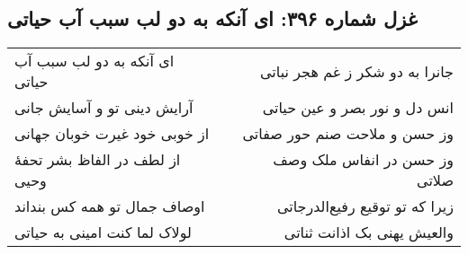 \begin{center}
\section*{غزل شماره ۳۹۶: ای آنکه به دو لب سبب آب حیاتی}
\label{sec:396}
\begin{longtable}{l p{0.5cm} r}
ای آنکه به دو لب سبب آب حیاتی
&&
جانرا به دو شکر ز غم هجر نباتی
\\
آرایش دینی تو و آسایش جانی
&&
انس دل و نور بصر و عین حیاتی
\\
از خوبی خود غیرت خوبان جهانی
&&
وز حسن و ملاحت صنم حور صفاتی
\\
از لطف در الفاظ بشر تحفهٔ وحیی
&&
وز حسن در انفاس ملک وصف صلاتی
\\
اوصاف جمال تو همه کس بنداند
&&
زیرا که تو توقیع رفیع‌الدرجاتی
\\
لولاک لما کنت امینی به حیاتی
&&
والعیش یهنی بک اذانت ثناتی
\\
\end{longtable}
\end{center}
